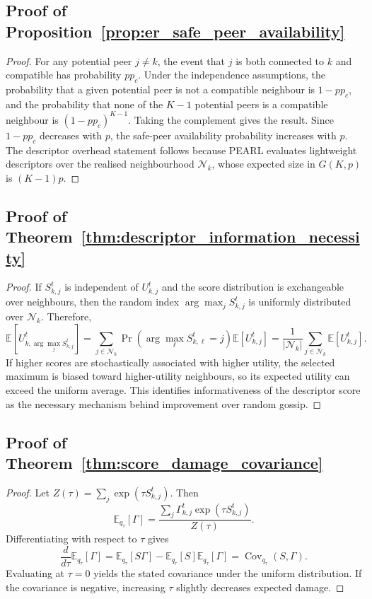 \documentclass[conference]{IEEEtran}
\begin{document}
\subsection{Proof of Proposition~\ref{prop:er_safe_peer_availability}}
\begin{proof}
For any potential peer \(j\neq k\), the event that \(j\) is both connected to \(k\) and compatible has probability \(pp_c\). Under the independence assumptions, the probability that a given potential peer is not a compatible neighbour is \(1-pp_c\), and the probability that none of the \(K-1\) potential peers is a compatible neighbour is \((1-pp_c)^{K-1}\). Taking the complement gives the result. Since \(1-pp_c\) decreases with \(p\), the safe-peer availability probability increases with \(p\). The descriptor overhead statement follows because PEARL evaluates lightweight descriptors over the realised neighbourhood \(\mathcal{N}_k\), whose expected size in \(G(K,p)\) is \((K-1)p\).
\end{proof}

\subsection{Proof of Theorem~\ref{thm:descriptor_information_necessity}}
\begin{proof}
If \(S_{k,j}^t\) is independent of \(U_{k,j}^t\) and the score distribution is exchangeable over neighbours, then the random index \(\arg\max_j S_{k,j}^t\) is uniformly distributed over \(\mathcal{N}_k\). Therefore,
\[
\mathbb{E}\!\left[
U_{k,\arg\max_j S_{k,j}^t}^t
\right]
=
\sum_{j\in\mathcal{N}_k}
\Pr(\arg\max_\ell S_{k,\ell}^t=j)
\mathbb{E}[U_{k,j}^t]
=
\frac{1}{|\mathcal{N}_k|}
\sum_{j\in\mathcal{N}_k}
\mathbb{E}[U_{k,j}^t].
\]
If higher scores are stochastically associated with higher utility, the selected maximum is biased toward higher-utility neighbours, so its expected utility can exceed the uniform average. This identifies informativeness of the descriptor score as the necessary mechanism behind improvement over random gossip.
\end{proof}

\subsection{Proof of Theorem~\ref{thm:score_damage_covariance}}
\begin{proof}
Let \(Z(\tau)=\sum_j \exp(\tau S_{k,j}^t)\). Then
\[
\mathbb{E}_{q_\tau}[\Gamma]
=
\frac{\sum_j \Gamma_{k,j}^t \exp(\tau S_{k,j}^t)}{Z(\tau)}.
\]
Differentiating with respect to \(\tau\) gives
\[
\frac{d}{d\tau}\mathbb{E}_{q_\tau}[\Gamma]
=
\mathbb{E}_{q_\tau}[S\Gamma]
-
\mathbb{E}_{q_\tau}[S]\mathbb{E}_{q_\tau}[\Gamma]
=
\operatorname{Cov}_{q_\tau}(S,\Gamma).
\]
Evaluating at \(\tau=0\) yields the stated covariance under the uniform distribution. If the covariance is negative, increasing \(\tau\) slightly decreases expected damage.
\end{proof}
\end{document}
